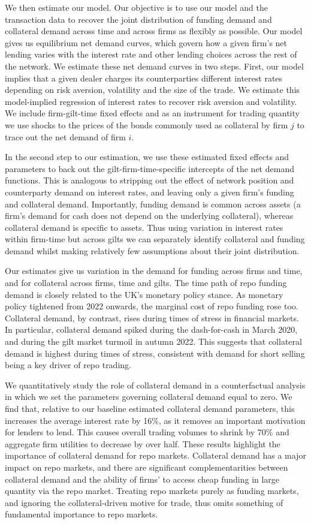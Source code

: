We then estimate our model. Our objective is to use our model and the transaction data to recover the joint distribution of funding demand and collateral demand across time and across firms as flexibly as possible. Our model gives us equilibrium net demand curves, which govern how a given firm's net lending varies with the interest rate and other lending choices across the rest of the network. We estimate these net demand curves in two steps.  First, our model implies that a given dealer charges its counterparties different interest rates depending on risk aversion, volatility and the size of the trade. We estimate this model-implied regression of interest rates to recover risk aversion and volatility. We include firm-gilt-time fixed effects and as an instrument for trading quantity we use shocks to the prices of the bonds commonly used as collateral by firm $j$ to trace out the net demand of firm $i$.

In the second step to our estimation, we use these estimated fixed effects and parameters to back out the gilt-firm-time-specific intercepts of the net demand functions. This is analogous to stripping out the effect of network position and counterparty demand on interest rates, and leaving only a given firm's funding and collateral demand. Importantly, funding demand is common across assets (a firm's demand for cash does not depend on the underlying collateral), whereas collateral demand is specific to assets. Thus using variation in interest rates within firm-time but across gilts we can separately identify collateral and funding demand whilst making relatively few assumptions about their joint distribution.

Our estimates give us variation in the demand for funding across firms and time, and for collateral across firms, time and gilts. The time path of repo funding demand is closely related to the UK's monetary policy stance. As monetary policy tightened from 2022 onwards, the marginal cost of repo funding rose too. Collateral demand, by contrast, rises during times of stress in financial markets. In particular, collateral demand spiked during the dash-for-cash in March 2020, and during the gilt market turmoil in autumn 2022. This suggests that collateral demand is highest during times of stress, consistent with demand for short selling being a key driver of repo trading.

We quantitatively study the role of collateral demand in a counterfactual analysis in which we set the parameters governing collateral demand equal to zero. We find that, relative to our baseline estimated collateral demand parameters, this increases the average interest rate by 16\%, as it removes an important motivation for lenders to lend. This causes overall trading volumes to shrink by 70\% and aggregate firm utilities to decrease by over half. These results highlight the importance of collateral demand for repo markets. Collateral demand has a major impact on repo markets, and there are significant complementarities between collateral demand and the ability of firms’ to access cheap funding in large quantity via the repo market. Treating repo markets purely as funding markets, and ignoring the collateral-driven motive for trade, thus omits something of fundamental importance to repo markets.

